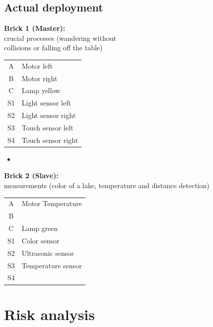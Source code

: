 \documentclass[11pt,a4paper]{article}
\begin{document}
\subsection{Actual deployment}

\begin{minipage}[t]{0.4\textwidth}

\textbf{Brick 1 (Master):} \\
crucial processes (wandering without \\collisions or falling off the table)

	\begin{tabular}{|c|l|}
	\hline
	A & Motor left\\
	B & Motor right\\
	C & Lamp yellow\\
	S1 & Light sensor left\\
	S2 & Light sensor right\\
	S3 & Touch sensor left\\
	S4 & Touch sensor right\\
	\hline
	\end{tabular}
	
\end{minipage}
\begin{minipage}[t]{0.2\textwidth}
	\begin{itemize}
	\item[ ]
	\end{itemize}
\end{minipage}
\begin{minipage}[t]{0.4\textwidth}

\textbf{Brick 2 (Slave):} \\
measurements (color of a lake, temperature and distance detection)

	\begin{tabular}{|c|l|}
	\hline
	A & Motor Temperature\\
	B & \\
	C & Lamp green\\
	S1 & Color sensor\\
	S2 & Ultrasonic sensor\\
	S3 & Temperature sensor\\
	S4 & \\
	\hline
	\end{tabular}
\end{minipage}

\section{Risk analysis}
\end{document}
